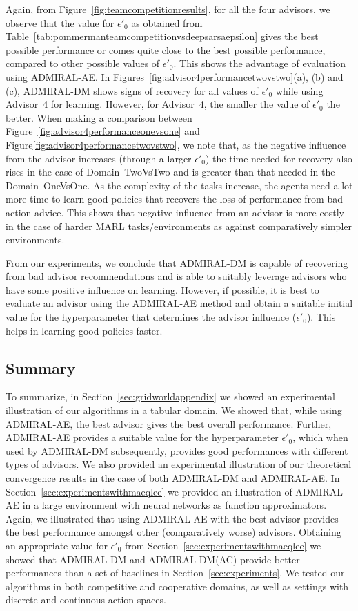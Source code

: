 \documentclass[jair, twoside,11pt,theapa]{article}
\begin{document}
 Again, from Figure~\ref{fig:teamcompetitionresults}, for all the four advisors, we  observe that the value for $\epsilon'_0$ as obtained from Table~\ref{tab:pommermanteamcompetitionvsdeepsarsaepsilon} gives the best possible performance or comes quite close to the best possible performance, compared to other possible values of $\epsilon'_0$. This shows the advantage of evaluation using ADMIRAL-AE. In Figures~\ref{fig:advisor4performancetwovstwo}(a), (b) and (c), ADMIRAL-DM shows signs of recovery for all values of $\epsilon'_0$ while using Advisor~4 for learning. However, for Advisor~4, the smaller the value of $\epsilon'_0$ the better. When making a comparison between  Figure~\ref{fig:advisor4performanceonevsone} and Figure\ref{fig:advisor4performancetwovstwo}, we note that, as the negative influence from the advisor increases (through a larger $\epsilon'_0$) the time needed for recovery also rises in the case of Domain~TwoVsTwo and is greater than that needed in the Domain~OneVsOne. As the complexity of the tasks increase, the agents need a lot more time to learn good policies that recovers the loss of performance from bad action-advice.  This shows that negative influence from an advisor is more costly in the case of harder MARL tasks/environments as against comparatively simpler environments. 
 
 
From our experiments, we conclude that ADMIRAL-DM is capable of recovering from bad advisor recommendations and is able to suitably leverage  advisors who have some positive influence on learning. However, if possible, it is best to evaluate an advisor using the ADMIRAL-AE method and obtain a suitable initial value for the hyperparameter that determines the advisor influence ($\epsilon'_0$). This helps in learning good policies faster.


\subsection{Summary}


To summarize, in Section~\ref{sec:gridworldappendix} we showed an experimental illustration of our algorithms in a tabular domain. We showed that, while using ADMIRAL-AE, the best advisor gives the best overall performance. Further, ADMIRAL-AE provides a suitable value for the hyperparameter $\epsilon'_0$, which when used by ADMIRAL-DM subsequently, provides good performances with different types of advisors. We also provided an experimental illustration of our theoretical convergence results in the case of both ADMIRAL-DM and ADMIRAL-AE. In Section~\ref{sec:experimentswithmaeqlee} we provided an illustration of ADMIRAL-AE in a large environment with neural networks as function approximators. Again, we illustrated that using ADMIRAL-AE with the best advisor provides the best performance amongst other (comparatively worse) advisors. Obtaining an appropriate value for $\epsilon'_0$ from Section~\ref{sec:experimentswithmaeqlee} we showed that ADMIRAL-DM and ADMIRAL-DM(AC) provide better performances than a set of baselines in Section~\ref{sec:experiments}. We tested our algorithms in both competitive and cooperative domains, as well as settings with discrete and continuous action spaces.   
\end{document}
